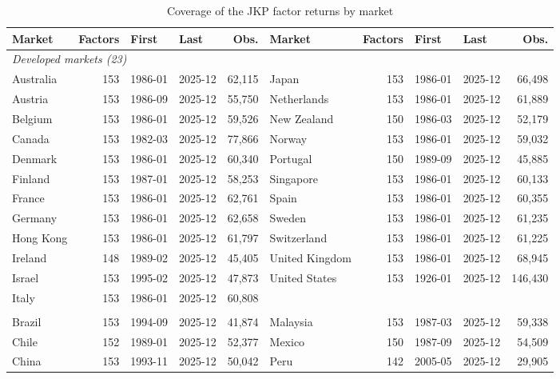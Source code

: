 \begin{table}[!ht]
\centering\footnotesize\setlength{\tabcolsep}{4pt}
\caption{Coverage of the JKP factor returns by market}
\label{tab:coverage}
\begin{tabular}{lrllr@{\hspace{6pt}}lrllr}
\toprule
Market & Factors & First & Last & Obs. & Market & Factors & First & Last & Obs. \\
\midrule
\multicolumn{10}{l}{\textit{Developed markets (23)}} \\
Australia & 153 & 1986-01 & 2025-12 & 62,115 & Japan & 153 & 1986-01 & 2025-12 & 66,498 \\
Austria & 153 & 1986-09 & 2025-12 & 55,750 & Netherlands & 153 & 1986-01 & 2025-12 & 61,889 \\
Belgium & 153 & 1986-01 & 2025-12 & 59,526 & New Zealand & 150 & 1986-03 & 2025-12 & 52,179 \\
Canada & 153 & 1982-03 & 2025-12 & 77,866 & Norway & 153 & 1986-01 & 2025-12 & 59,032 \\
Denmark & 153 & 1986-01 & 2025-12 & 60,340 & Portugal & 150 & 1989-09 & 2025-12 & 45,885 \\
Finland & 153 & 1987-01 & 2025-12 & 58,253 & Singapore & 153 & 1986-01 & 2025-12 & 60,133 \\
France & 153 & 1986-01 & 2025-12 & 62,761 & Spain & 153 & 1986-01 & 2025-12 & 60,355 \\
Germany & 153 & 1986-01 & 2025-12 & 62,658 & Sweden & 153 & 1986-01 & 2025-12 & 61,235 \\
Hong Kong & 153 & 1986-01 & 2025-12 & 61,797 & Switzerland & 153 & 1986-01 & 2025-12 & 61,225 \\
Ireland & 148 & 1989-02 & 2025-12 & 45,405 & United Kingdom & 153 & 1986-01 & 2025-12 & 68,945 \\
Israel & 153 & 1995-02 & 2025-12 & 47,873 & United States & 153 & 1926-01 & 2025-12 & 146,430 \\
Italy & 153 & 1986-01 & 2025-12 & 60,808 &  &  &  &  &  \\
\addlinespace
\multicolumn{10}{l}{\textit{Emerging markets (24)}} \\
Brazil & 153 & 1994-09 & 2025-12 & 41,874 & Malaysia & 153 & 1987-03 & 2025-12 & 59,338 \\
Chile & 152 & 1989-01 & 2025-12 & 52,377 & Mexico & 150 & 1987-09 & 2025-12 & 54,509 \\
China & 153 & 1993-11 & 2025-12 & 50,042 & Peru & 142 & 2005-05 & 2025-12 & 29,905 \\

\end{tabular}
\end{table}
